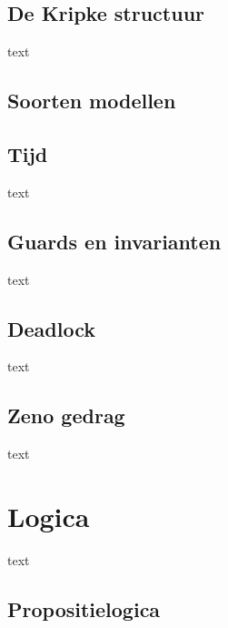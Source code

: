\documentclass{article}
\begin{document}
		\subsection{De Kripke structuur}
		
		text
		
		\subsection{Soorten modellen}
		
		\newpage
		
		\subsection{Tijd}
		
		text
		
		\subsection{Guards en invarianten}
		
		text
		
		\subsection{Deadlock}
		
		text
		
		\subsection{Zeno gedrag}
		
		text
		
	\newpage
	
	
	\section{Logica}
	
	text
	
		\subsection{Propositielogica}
		
\end{document}

